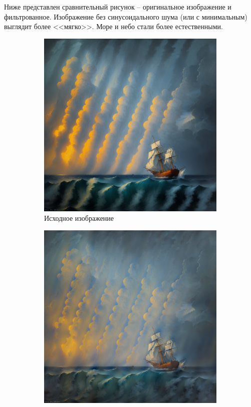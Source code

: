 \documentclass[a4paper, 12pt]{article}
\begin{document}
    Ниже представлен сравнительный рисунок -- оригинальное изображение и фильтрованное.
    Изображение без синусоидального шума (или с минимальным) выглядит более <<мягко>>.
    Море и небо стали более естественными.
    \begin{figure}[H]
        \centering
        \begin{subfigure}{0.45\textwidth}
            \centering
            \includegraphics[width=\linewidth]{4.png}
            \caption{Исходное изображение}
            \label{fig:old}
        \end{subfigure}
        \begin{subfigure}{0.45\textwidth}
            \centering
            \includegraphics[width=\linewidth]{new_4.png}

\end{subfigure}
\end{figure}
\end{document}
